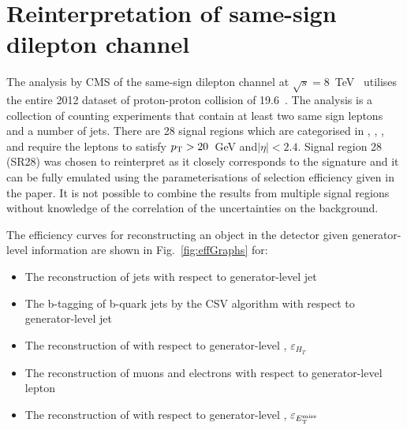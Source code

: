 \section{Reinterpretation of same-sign dilepton channel}

The analysis by CMS of the same-sign dilepton channel at $\sqrt{s}=8$~TeV~\cite{Chatrchyan:2013fea} utilises the entire 2012 dataset of proton-proton collision of 19.6~\fbinv. The analysis is a collection of counting experiments that contain at least two same sign leptons and a number of jets. There are 28 signal regions which are categorised in \njets, \nbtags, \HT, \MET and require the leptons to satisfy $p_{\mathrm{T}}>20$~GeV and$|\eta|<2.4$. Signal region 28 (SR28) was chosen to reinterpret as it closely corresponds to the \tttt signature and it can be fully emulated using the parameterisations of selection efficiency given in the paper. It is not possible to combine the results from multiple signal regions without knowledge of the correlation of the uncertainties on the background. 

The efficiency curves for reconstructing an object in the detector given generator-level information are shown in Fig.~\ref{fig:effGraphs} for:
\begin{itemize}
\item The reconstruction of jets with respect to generator-level jet \pt 
\item The b-tagging of b-quark jets by the CSV algorithm with respect to generator-level jet \pt
\item The reconstruction of \HT with respect to generator-level \HT, $\varepsilon_{H_T}$
\item The reconstruction of muons and electrons with respect to generator-level lepton \pt
\item The reconstruction of \MET with respect to generator-level \MET, $\varepsilon_{E_{\mathrm{T}}^{\text{miss}}}$
\end{itemize}

